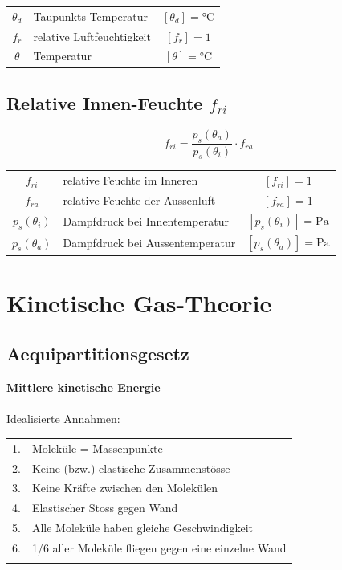 \begin{tabular}{c l c}
	$\theta_d$ & Taupunkts-Temperatur & $[\theta_d] = \text{°C}$ \\
	$f_r$ & relative Luftfeuchtigkeit & $[f_r] = 1$ \\
	$\theta$ & Temperatur & $[\theta] = \text{°C}$ \\
\end{tabular}




\subsection{Relative Innen-Feuchte $f_{ri}$}

$$ \boxed{ f_{ri} = \frac{p_s(\theta_a)}{p_s(\theta_i)} \cdot f_{ra}  }$$

\begin{tabular}{c l c}
	$f_{ri}$ & relative Feuchte im Inneren & $[f_{ri}] = 1$ \\
	$f_{ra}$ & relative Feuchte der Aussenluft & $[f_{ra}] = \text{1}$ \\
	$p_s(\theta_i)$ & Dampfdruck bei Innentemperatur & $[p_s(\theta_i)] = \mathrm{Pa}$ \\
	$p_s(\theta_a)$ & Dampfdruck bei Aussentemperatur &  $[p_s(\theta_a)] = \mathrm{Pa}$  \\
\end{tabular}





\section{Kinetische Gas-Theorie} %

\subsection{Aequipartitionsgesetz}

\textbf{Mittlere kinetische Energie} \\
\\
Idealisierte Annahmen: \\

\begin{tabular}{ll}
1. & Moleküle = Massenpunkte \\
2. & Keine (bzw.) elastische Zusammenstösse \\
3. & Keine Kräfte zwischen den Molekülen\\
4. & Elastischer Stoss gegen Wand \\
5. & Alle Moleküle haben gleiche Geschwindigkeit \\
6. & 1/6 aller Moleküle fliegen gegen eine einzelne Wand \\
\\
\end{tabular}


